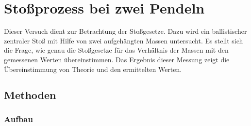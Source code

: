 \section{Stoßprozess bei zwei Pendeln}
	
	Dieser Versuch dient zur Betrachtung der Stoßgesetze. Dazu wird ein ballistischer zentraler Stoß mit Hilfe von zwei aufgehängten Massen untersucht. Es stellt sich die Frage, wie genau die Stoßgesetze für das Verhältnis der Massen mit den gemessenen Werten übereinstimmen. Das Ergebnis dieser Messung zeigt die Übereinstimmung von Theorie und den ermittelten Werten. 
	
	\subsection{Methoden}
		
		\subsubsection{Aufbau}
			
